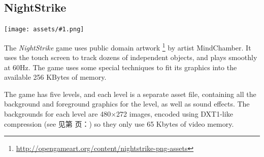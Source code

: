 \documentclass[10pt]{book}
\newcommand{\png}[1]{
\begin{center}
\texttt{[image: assets/\#1.png]}
\end{center}
}
\newcommand{\xref}[1]{见第 \pageref{#1} 页：\textit{\nameref{#1}}}
\begin{document}
\begin{CJK}{UTF8}{gkai}
\newpage
\section{NightStrike}
\label{nightstrike}

\png{nightstrike}

The \textit{NightStrike} game uses public domain artwork
\footnote{\url{http://opengameart.org/content/nightstrike-png-assets}}
by artist MindChamber.
It uses the touch screen to track dozens of independent objects,
and plays smoothly at 60Hz.
The game uses some special techniques to fit its graphics into the available 256 KBytes of memory.

The game has five levels, and each level is a separate asset file, containing all the background and foreground graphics
for the level, as well as sound effects.
The backgrounds for each level are 480$\times$272 images, encoded using DXT1-like compression
(see \xref{dxt1})
so they only use 65 Kbytes of video memory.


\end{CJK}
\end{document}
